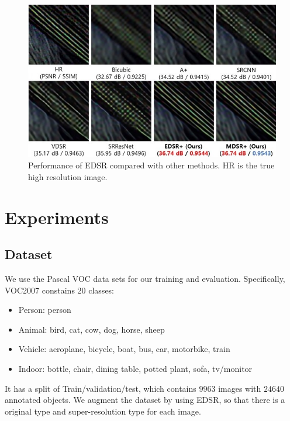 \documentclass[journal,conference]{IEEEtran}
\begin{document}
\begin{figure}[htbp]
  \centering
  \includegraphics[width=\linewidth]{fig/edsr.png}
  \caption{Performance of EDSR compared with other methods. HR is the true high resolution image.}\label{fig:edsr}
\end{figure}

\section{Experiments}

\subsection{Dataset}
We use the Pascal VOC data sets \cite{voc} for our training and evaluation. Specifically, VOC2007 constains 20 classes:
\begin{itemize}
  \item Person: person
  \item Animal: bird, cat, cow, dog, horse, sheep
  \item Vehicle: aeroplane, bicycle, boat, bus, car, motorbike, train
  \item Indoor: bottle, chair, dining table, potted plant, sofa, tv/monitor
\end{itemize}

It has a split of Train/validation/test, which contains $9963$ images with $24640$ annotated objects. We augment the dataset by using EDSR, so that there is a original type and super-resolution type for each image.
\end{document}
